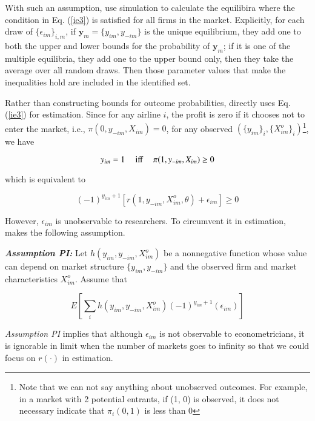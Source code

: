 \documentclass[a4paper]{article}
\begin{document}
With such an assumption, \cite{ciliberto2009market} use simulation to calculate the equilibira where the condition in Eq. (\ref{ie3}) is satisfied for all firms in the market. Explicitly, for each draw of $\{\epsilon_{im}\}_{i,m}$, if $\textbf{y}_m=\{y_{im}, y_{-im}\}$ is the unique equilibrium, they add one to both the upper and lower bounds for the probability of $\textbf{y}_m$; if it is one of the multiple equilibria, they add one to the upper bound only, then they take the average over all random draws. Then those parameter values that make the inequalities hold are included in the identified set. 


Rather than constructing bounds for outcome probabilities, \cite{pakes2015moment} directly uses Eq.(\ref{ie3}) for estimation. Since for any airline $i$, the profit is zero if it chooses not to enter the market, i.e., $\pi(0,y_{-im},X_{im})=0$, for any observed $(\{y_{im}\}_i, \{X^o_{im}\}_i)$\footnote{Note that we can not say anything about unobserved outcomes. For example, in a market with 2 potential entrants, if (1, 0) is observed, it does not necessary indicate that $\pi_i(0, 1)$ is less than 0}, we have


$$y_{im}=1 \mbox{ \quad iff \quad }  \pi(1,y_{-im},X_{im}) \geq 0$$


which is equivalent to 

\begin{equation}
 (-1)^{y_{im}+1}[r(1,y_{-im},X^o_{im},\theta)+ \epsilon_{im}]\geq 0
\label{rie}
\end{equation}



However, $\epsilon_{im}$ is unobservable to researchers. To circumvent it in estimation, \cite{pakes2015moment} makes the following assumption.

\bigskip
\textbf{\textit{Assumption PI:} }Let $h(y_{im},y_{-im},X^o_{im})$ be a nonnegative function whose value can depend on market structure $\{y_{im},y_{-im}\}$ and the observed firm and market characteristics $X^o_{im}$. Assume that 

\begin{equation}
E[\sum_i h(y_{im},y_{-im},X^o_{im}) (-1)^{y_{im}+1}(\epsilon_{im})]
\label{api}
\end{equation}


\bigskip

\textit{Assumption PI} implies that although $\epsilon_{im}$ is not observable to econometricians, it is ignorable in limit when the number of markets goes to infinity so that we could focus on $r(\cdot)$ in estimation.
\end{document}
